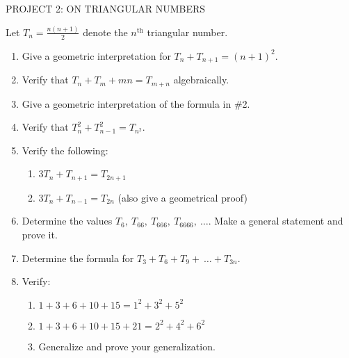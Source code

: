 \documentclass[10pt,letter]{article}
\begin{document}
PROJECT 2: ON TRIANGULAR NUMBERS

Let \(T_{n} = \frac{n\left( n + 1 \right)}{2}\) denote the
\(n^{\text{th}}\) triangular number.
\begin{enumerate}
\def\labelenumi{\arabic{enumi}.}

\item
  Give a geometric interpretation for
  \(T_{n} + T_{n + 1} = \left( n + 1 \right)^{2}.\)
\item
  Verify that \(T_{n} + T_{m} + mn = T_{m + n}\) algebraically.
\item
  Give a geometric interpretation of the formula in \#2.
\item
  Verify that \(T_{n}^{2} + T_{n - 1}^{2} = T_{n^{2}}\).
\item
  Verify the following:
\begin{enumerate}
  \def\labelenumii{\alph{enumii}.}

  \item
    \(3T_{n} + T_{n + 1} = T_{2n + 1}\)
  \item
    \(3T_{n} + T_{n - 1} = T_{2n}\) (also give a geometrical proof)

\end{enumerate}
\item
  Determine the values \(T_{6},\ T_{66},\ T_{666},\ T_{6666},\ \ldots\).
  Make a general statement and prove it.
\item
  Determine the formula for
  \(T_{3} + T_{6} + T_{9} + \ \ldots + T_{3n}.\)
\item
  Verify:
\begin{enumerate}
  \def\labelenumii{\alph{enumii}.}

  \item
    \(1 + 3 + 6 + 10 + 15 = 1^{2} + 3^{2} + 5^{2}\)
  \item
    \(1 + 3 + 6 + 10 + 15 + 21 = 2^{2} + 4^{2} + 6^{2}\)
  \item
    Generalize and prove your generalization.

\end{enumerate}

\end{enumerate}
\end{document}
